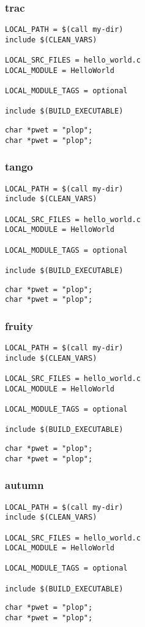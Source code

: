 \begin{frame}[fragile]
\frametitle{trac}
\begin{verbatim}
LOCAL_PATH = $(call my-dir)
include $(CLEAN_VARS)

LOCAL_SRC_FILES = hello_world.c
LOCAL_MODULE = HelloWorld

LOCAL_MODULE_TAGS = optional

include $(BUILD_EXECUTABLE)
\end{verbatim}
\begin{verbatim}
char *pwet = "plop";
char *pwet = "plop";
\end{verbatim}
\end{frame}

\begin{frame}[fragile]
\frametitle{tango}
\begin{verbatim}
LOCAL_PATH = $(call my-dir)
include $(CLEAN_VARS)

LOCAL_SRC_FILES = hello_world.c
LOCAL_MODULE = HelloWorld

LOCAL_MODULE_TAGS = optional

include $(BUILD_EXECUTABLE)
\end{verbatim}
\begin{verbatim}
char *pwet = "plop";
char *pwet = "plop";
\end{verbatim}
\end{frame}

\begin{frame}[fragile]
\frametitle{fruity}
\begin{verbatim}
LOCAL_PATH = $(call my-dir)
include $(CLEAN_VARS)

LOCAL_SRC_FILES = hello_world.c
LOCAL_MODULE = HelloWorld

LOCAL_MODULE_TAGS = optional

include $(BUILD_EXECUTABLE)
\end{verbatim}
\begin{verbatim}
char *pwet = "plop";
char *pwet = "plop";
\end{verbatim}
\end{frame}

\begin{frame}[fragile]
\frametitle{autumn}
\begin{verbatim}
LOCAL_PATH = $(call my-dir)
include $(CLEAN_VARS)

LOCAL_SRC_FILES = hello_world.c
LOCAL_MODULE = HelloWorld

LOCAL_MODULE_TAGS = optional

include $(BUILD_EXECUTABLE)
\end{verbatim}
\begin{verbatim}
char *pwet = "plop";
char *pwet = "plop";
\end{verbatim}
\end{frame}


